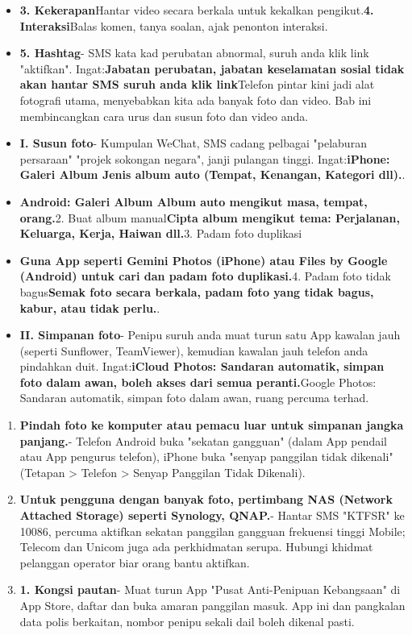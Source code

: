 
\begin{itemize}
  \item \textbf{3. Kekerapan}Hantar video secara berkala untuk kekalkan pengikut.\textbf{4. Interaksi}Balas komen, tanya soalan, ajak penonton interaksi.
  \item \textbf{5. Hashtag}- SMS kata kad perubatan abnormal, suruh anda klik link "aktifkan". Ingat:\textbf{Jabatan perubatan, jabatan keselamatan sosial tidak akan hantar SMS suruh anda klik link}Telefon pintar kini jadi alat fotografi utama, menyebabkan kita ada banyak foto dan video. Bab ini membincangkan cara urus dan susun foto dan video anda.
  \item \textbf{I. Susun foto}- Kumpulan WeChat, SMS cadang pelbagai "pelaburan persaraan" "projek sokongan negara", janji pulangan tinggi. Ingat:\textbf{iPhone: Galeri Album Jenis album auto (Tempat, Kenangan, Kategori dll).}.
  \item \textbf{Android: Galeri Album Album auto mengikut masa, tempat, orang.}2. Buat album manual\textbf{Cipta album mengikut tema: Perjalanan, Keluarga, Kerja, Haiwan dll.}3. Padam foto duplikasi
  \item \textbf{Guna App seperti Gemini Photos (iPhone) atau Files by Google (Android) untuk cari dan padam foto duplikasi.}4. Padam foto tidak bagus\textbf{Semak foto secara berkala, padam foto yang tidak bagus, kabur, atau tidak perlu.}.
  \item \textbf{II. Simpanan foto}- Penipu suruh anda muat turun satu App kawalan jauh (seperti Sunflower, TeamViewer), kemudian kawalan jauh telefon anda pindahkan duit. Ingat:\textbf{iCloud Photos: Sandaran automatik, simpan foto dalam awan, boleh akses dari semua peranti.}Google Photos: Sandaran automatik, simpan foto dalam awan, ruang percuma terhad.
\end{itemize}


\begin{enumerate}
  \item \textbf{Pindah foto ke komputer atau pemacu luar untuk simpanan jangka panjang.}- Telefon Android buka "sekatan gangguan" (dalam App pendail atau App pengurus telefon), iPhone buka "senyap panggilan tidak dikenali" (Tetapan > Telefon > Senyap Panggilan Tidak Dikenali).
  \item \textbf{Untuk pengguna dengan banyak foto, pertimbang NAS (Network Attached Storage) seperti Synology, QNAP.}- Hantar SMS "KTFSR" ke 10086, percuma aktifkan sekatan panggilan gangguan frekuensi tinggi Mobile; Telecom dan Unicom juga ada perkhidmatan serupa. Hubungi khidmat pelanggan operator biar orang bantu aktifkan.
  \item \textbf{1. Kongsi pautan}- Muat turun App "Pusat Anti-Penipuan Kebangsaan" di App Store, daftar dan buka amaran panggilan masuk. App ini dan pangkalan data polis berkaitan, nombor penipu sekali dail boleh dikenal pasti.
\end{enumerate}

